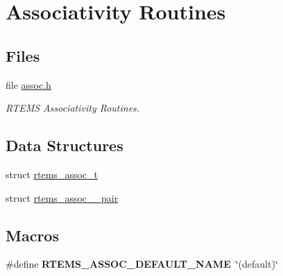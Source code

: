 \hypertarget{group__RTEMSAPIAssociativity}{}\section{Associativity Routines}
\label{group__RTEMSAPIAssociativity}
\subsection*{Files}
\begin{DoxyCompactItemize}
\item 
file \mbox{\hyperlink{assoc_8h}{assoc.\+h}}
\begin{DoxyCompactList}\small\item\em R\+T\+E\+MS Associativity Routines. \end{DoxyCompactList}\end{DoxyCompactItemize}
\subsection*{Data Structures}
\begin{DoxyCompactItemize}
\item 
struct \mbox{\hyperlink{structrtems__assoc__t}{rtems\+\_\+assoc\+\_\+t}}
\item 
struct \mbox{\hyperlink{structrtems__assoc__32__pair}{rtems\+\_\+assoc\+\_\+\_\+pair}}
\end{DoxyCompactItemize}
\subsection*{Macros}
\begin{DoxyCompactItemize}
\item 
\mbox{\label{group__RTEMSAPIAssociativity_ga81098ef3214cb3c7614c1a61a1a54f22}} 
\#define {\bfseries R\+T\+E\+M\+S\+\_\+\+A\+S\+S\+O\+C\+\_\+\+D\+E\+F\+A\+U\+L\+T\+\_\+\+N\+A\+ME}~\char`\"{}(default)\char`\"{}
\end{DoxyCompactItemize}
